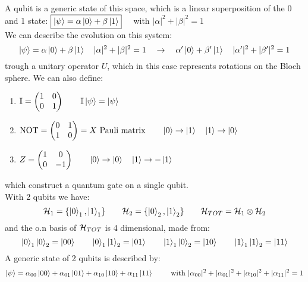 A qubit is a generic state of this space, which is a linear superposition of the 0 and 1 state: $\boxed{\left|\psi\right\rangle = \alpha \left|0\right\rangle + \beta\left|1\right\rangle} \quad $ with $|\alpha|^2 + |\beta|^2 = 1$\\

We can describe the evolution on this system:
$$ \left|\psi\right\rangle = \alpha \left|0\right\rangle + \beta \left|1\right\rangle \quad |\alpha|^2 + |\beta|^2 = 1 \quad \to\quad  \alpha' \left|0\right\rangle + \beta ' \left|1\right\rangle \quad |\alpha'|^2 + |\beta'|^2 = 1$$
trough a unitary operator $U$, which in this case represents rotations on the Bloch sphere. We can also define:
\begin{enumerate}
    \item $\mathbb{I} = \begin{pmatrix} 1&0\\0&1  \end{pmatrix} \qquad \mathbb{I}\left|\psi\right\rangle = \left|\psi\right\rangle$
    \item $\text{NOT} = \begin{pmatrix}
        0&1\\1&0    \end{pmatrix} = X \text{ Pauli matrix}  \qquad \left|0\right\rangle \to \left|1\right\rangle\quad \left|1\right\rangle \to \left|0\right\rangle$
    \item $Z = \begin{pmatrix}
        1&0\\0&-1    \end{pmatrix} \qquad \left|0\right\rangle\to \left|0\right\rangle\quad \left|1\right\rangle \to -\left|1\right\rangle$
\end{enumerate}
which construct a quantum gate on a single qubit.\\

With 2 qubits we have:
$$\mathcal{H}_1 = \{\left|0\right\rangle_1, \left|1\right\rangle_1\} \qquad \mathcal{H}_2 = \{\left|0\right\rangle_2, \left|1\right\rangle_2\} \qquad \mathcal{H}_{TOT} = \mathcal{H}_1 \otimes \mathcal{H}_2$$
and the o.n basis of $\mathcal{H}_{TOT}$ is 4 dimensional, made from:
$$\left|0\right\rangle_1 \left|0\right\rangle_2 = \left|00\right\rangle \qquad \left|0\right\rangle_1 \left|1\right\rangle_2 = \left|01\right\rangle \qquad \left|1\right\rangle_1 \left|0\right\rangle_2 = \left|10\right\rangle \qquad \left|1\right\rangle_1 \left|1\right\rangle_2 = \left|11\right\rangle$$
A generic state of 2 qubits is described by:
$$\left|\psi\right\rangle = \alpha_{00} \left|00\right\rangle + \alpha_{01}\left|01\right\rangle + \alpha_{10}\left|10\right\rangle + \alpha_{11}\left|11\right\rangle \qquad \text{ with } |\alpha_{00}|^2 + |\alpha_{01}|^2 +|\alpha_{10}|^2 +|\alpha_{11}|^2 = 1$$

